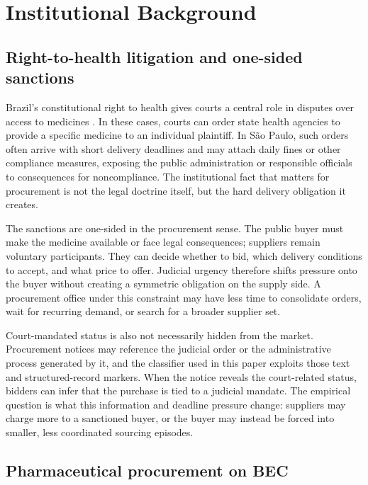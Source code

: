 \section{Institutional Background}
\label{sec:institutional}

\subsection{Right-to-health litigation and one-sided sanctions}
\label{subsec:litigation}

Brazil's constitutional right to health gives courts a central role in disputes over access to medicines \citep{ferraz2009right,wang2015right,cnj2019judicializacao}. In these cases, courts can order state health agencies to provide a specific medicine to an individual plaintiff. In S\~ao Paulo, such orders often arrive with short delivery deadlines and may attach daily fines or other compliance measures, exposing the public administration or responsible officials to consequences for noncompliance. The institutional fact that matters for procurement is not the legal doctrine itself, but the hard delivery obligation it creates.

The sanctions are one-sided in the procurement sense. The public buyer must make the medicine available or face legal consequences; suppliers remain voluntary participants. They can decide whether to bid, which delivery conditions to accept, and what price to offer. Judicial urgency therefore shifts pressure onto the buyer without creating a symmetric obligation on the supply side. A procurement office under this constraint may have less time to consolidate orders, wait for recurring demand, or search for a broader supplier set.

Court-mandated status is also not necessarily hidden from the market. Procurement notices may reference the judicial order or the administrative process generated by it, and the classifier used in this paper exploits those text and structured-record markers. When the notice reveals the court-related status, bidders can infer that the purchase is tied to a judicial mandate. The empirical question is what this information and deadline pressure change: suppliers may charge more to a sanctioned buyer, or the buyer may instead be forced into smaller, less coordinated sourcing episodes.

\subsection{Pharmaceutical procurement on BEC}
\label{subsec:bec}

